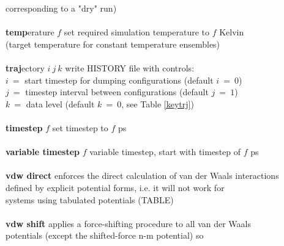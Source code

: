 \begin{tabbing}
\>                                              \> corresponding to a "dry" run) \\
\>                                              \> \\
\> {\bf temp}erature $f$                        \> set required simulation temperature to $f$ Kelvin \\
\>                                              \> (target temperature for constant temperature ensembles) \\
\>                                              \> \\
\> {\bf traj}ectory $i~j~k$                     \> write HISTORY file with controls: \\
\>                                              \> $i~=$ start timestep for dumping configurations (default $i~=~0$) \\
\>                                              \> $j~=$ timestep interval between configurations (default $j~=~1$) \\
\>                                              \> $k~=$ data level (default $k~=~0$, see Table \ref{keytrj}) \\
\>                                              \> \\
\> {\bf timestep} $f$                           \> set timestep to $f$ ps \\
\>                                              \> \\
\> {\bf variable timestep} $f$                  \> variable timestep, start with timestep of $f$ ps \\
\>                                              \> \\
\> {\bf vdw direct}                             \> enforces the direct calculation of van der Waals interactions \\
\>                                              \> defined by explicit potential forms, i.e. it will not work for \\
\>                                              \> systems using tabulated potentials (TABLE) \\
\>                                              \> \\
\> {\bf vdw shift}                              \> applies a force-shifting procedure to all van der Waals \\
\>                                              \> potentials (except the shifted-force n-m potential) so \\

\end{tabbing}
